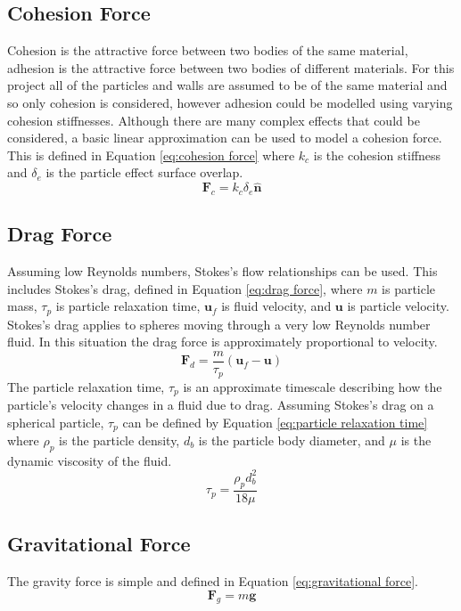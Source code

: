 \documentclass[a4paper,11pt,titlepage]{report}
\begin{document}
\subsection{Cohesion Force}
Cohesion is the attractive force between two bodies of the same material, adhesion is the attractive force between two bodies of different materials. For this project all of the particles and walls are assumed to be of the same material and so only cohesion is considered, however adhesion could be modelled using varying cohesion stiffnesses. Although there are many complex effects that could be considered\cite{tuley}, a basic linear approximation can be used to model a cohesion force. This is defined in Equation \ref{eq:cohesion force} where $k_c$ is the cohesion stiffness and $\delta_e$ is the particle effect surface overlap.
\begin{equation}
\mathbf{F}_{c} = k_{c} \delta_{e} \mathbf{\hat{n}}
\label{eq:cohesion force}
\end{equation}
\subsection{Drag Force}
\label{sec:drag force}
Assuming low Reynolds numbers, Stokes's flow relationships can be used. This includes Stokes's drag, defined in Equation \ref{eq:drag force}, where $m$ is particle mass, $\tau_p$ is particle relaxation time, $\mathbf{u}_f$ is fluid velocity, and $\mathbf{u}$ is particle velocity. Stokes's drag applies to spheres moving through a very low Reynolds number fluid. In this situation the drag force is approximately proportional to velocity.
\begin{equation}
\label{eq:drag force}
\mathbf{F}_{d} = \dfrac{m}{\tau_p} (\mathbf{u}_f - \mathbf{u})
\end{equation}
The particle relaxation time, $\tau_p$ is an approximate timescale describing how the particle's velocity changes in a fluid due to drag. Assuming Stokes's drag on a spherical particle, $\tau_p$ can be defined by Equation \ref{eq:particle relaxation time} where $\rho_p$ is the particle density, $d_b$ is the particle body diameter, and $\mu$ is the dynamic viscosity of the fluid\cite{achow}.
\begin{equation}
\label{eq:particle relaxation time}
\tau_{p} = \dfrac{\rho_{p} d^{2}_{b}}{18 \mu}
\end{equation}
\subsection{Gravitational Force}
\label{sec:gravitational force}
The gravity force is simple and defined in Equation \ref{eq:gravitational force}.
\begin{equation}
\label{eq:gravitational force}
\mathbf{F}_{g} = m \mathbf{g}
\end{equation}
\end{document}
